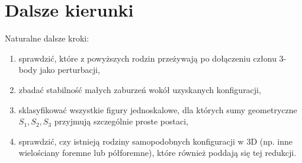 \documentclass[11pt,a4paper]{article}
\theoremstyle{plain}
\theoremstyle{remark}
\begin{document}
\section{Dalsze kierunki}

Naturalne dalsze kroki:
\begin{enumerate}
    \item sprawdzić, które z powyższych rodzin przeżywają po dołączeniu członu 3-body jako perturbacji,
    \item zbadać stabilność małych zaburzeń wokół uzyskanych konfiguracji,
    \item sklasyfikować wszystkie figury jednoskalowe, dla których sumy geometryczne $S_1,S_2,S_3$ przyjmują szczególnie proste postaci,
    \item sprawdzić, czy istnieją rodziny samopodobnych konfiguracji w 3D (np. inne wielościany foremne lub półforemne), które również poddają się tej redukcji.
\end{enumerate}
\end{document}
